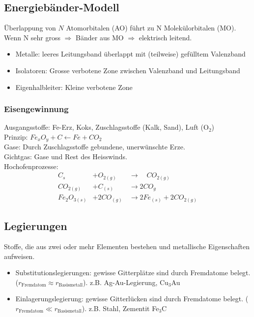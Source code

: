\subsection{Energiebänder-Modell}
Überlappung von $N$ Atomorbitalen (AO) führt zu N Molekülorbitalen (MO). Wenn N sehr gross $\Rightarrow$ Bänder aus MO $\Rightarrow$ elektrisch leitend.
\begin{itemize}
	\item Metalle: leeres Leitungsband überlappt mit (teilweise) gefülltem Valenzband
	\item Isolatoren: Grosse verbotene Zone zwischen Valenzband und Leitungsband
	\item Eigenhalbleiter: Kleine verbotene Zone
\end{itemize}

\subsubsection{Eisengewinnung}
Ausgangsstoffe: Fe-Erz, Koks, Zuschlagsstoffe (Kalk, Sand), Luft (O$_2$) \\

Prinzip: $Fe_xO_y + C \leftarrow Fe + CO_2$ \\

Gase: Durch Zuschlagsstoffe gebundene, unerwünschte Erze. \\
Gichtgas: Gase und Rest des Heisswinds. \\

Hochofenprozesse:
\begin{eqnarray*}
	C_{s} \quad &+ O_{2(g)} \quad &\rightarrow \quad CO_{2(g)} \\
	CO_{2(g)} &+ C_{(s)} & \rightarrow 2 CO_{g} \\
	Fe_2O_{3(s)} &+ 2 CO_{(g)} & \rightarrow 2 Fe_{(s)} + 2 CO_{2(g)} 
\end{eqnarray*}

\subsection{Legierungen}
Stoffe, die aus zwei oder mehr Elementen bestehen und metallische Eigenschaften aufweisen.

\begin{itemize}
	\item Substitutionslegierungen: gewisse Gitterplätze sind durch Fremdatome belegt. ($r_\text{Fremdatom} \approx r_\text{Basismetall}$). z.B. Ag-Au-Legierung, Cu$_3$Au
	\item Einlagerungslegierung: gewisse Gitterlücken sind durch Fremdatome belegt. ($r_\text{Fremdatom} \ll r_\text{Basismetall}$). z.B. Stahl, Zementit Fe$_3$C
\end{itemize}


